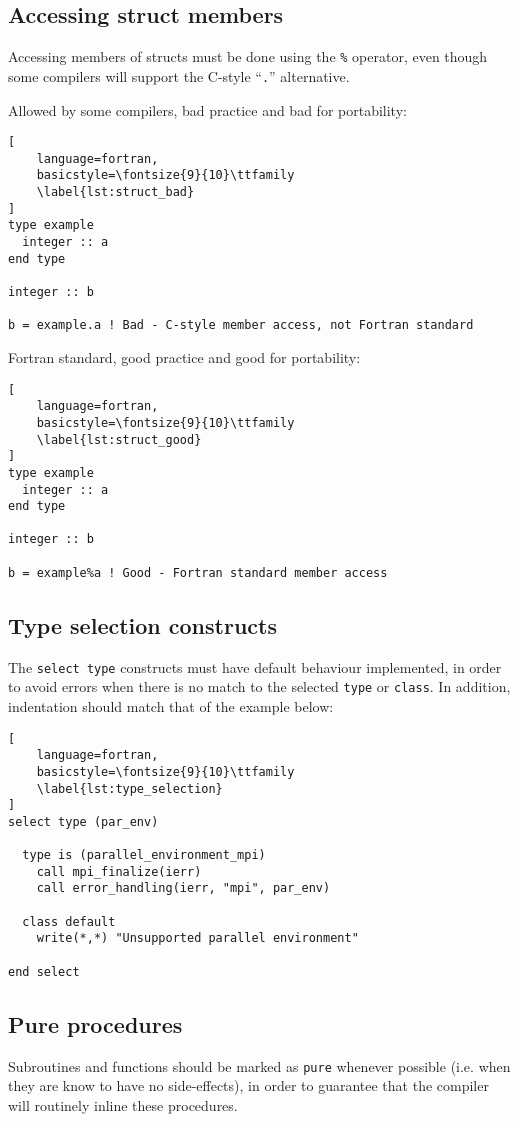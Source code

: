 \documentclass[11pt]{report}
\begin{document}
\subsection{Accessing struct members}
Accessing members of structs must be done using the \texttt{\%} operator, even though some compilers will support 
the C-style ``\texttt{.}'' alternative.

Allowed by some compilers, bad practice and bad for portability:
\begin{lstlisting}[
	language=fortran,
    basicstyle=\fontsize{9}{10}\ttfamily
    \label{lst:struct_bad}
]
type example
  integer :: a
end type

integer :: b

b = example.a ! Bad - C-style member access, not Fortran standard
\end{lstlisting}

Fortran standard, good practice and good for portability:
\begin{lstlisting}[
	language=fortran,
    basicstyle=\fontsize{9}{10}\ttfamily
    \label{lst:struct_good}
]
type example
  integer :: a
end type

integer :: b

b = example%a ! Good - Fortran standard member access
\end{lstlisting}

\subsection{Type selection constructs}
The \texttt{select type} constructs must have default behaviour implemented, in order to avoid errors when there is no match 
to the selected \texttt{type} or \texttt{class}. In addition, indentation should match that of the example below:

\begin{lstlisting}[
	language=fortran,
    basicstyle=\fontsize{9}{10}\ttfamily
    \label{lst:type_selection}
]
select type (par_env)

  type is (parallel_environment_mpi)   
    call mpi_finalize(ierr)
    call error_handling(ierr, "mpi", par_env)

  class default
    write(*,*) "Unsupported parallel environment"

end select
\end{lstlisting}

\subsection{Pure procedures}
Subroutines and functions should be marked as \texttt{pure} whenever possible (i.e. when they are know to have no side-effects), 
in order to guarantee that the compiler will routinely inline these procedures.
\end{document}
